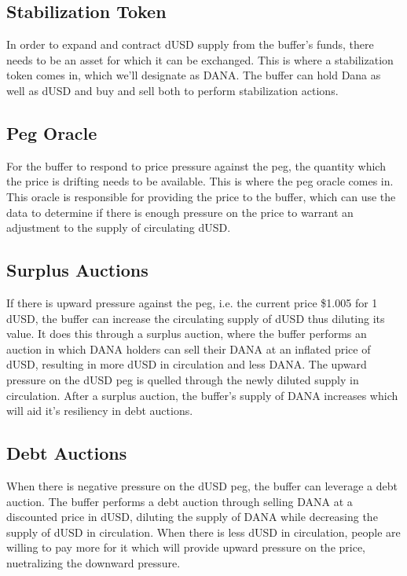 \documentclass[12pt]{article}
\begin{document}
\subsection{Stabilization Token}

In order to expand and contract dUSD supply from the buffer's funds, there needs to be an asset for which it can be exchanged. This is where a stabilization token comes in, which we'll designate as DANA. The buffer can hold Dana as well as dUSD and buy and sell both to perform stabilization actions.


\subsection{Peg Oracle}

For the buffer to respond to price pressure against the peg, the quantity which the price is drifting needs to be available. This is where the peg oracle comes in. This oracle is responsible for providing the price to the buffer, which can use the data to determine if there is enough pressure on the price to warrant an adjustment to the supply of circulating dUSD.


\subsection{Surplus Auctions}

If there is upward pressure against the peg, i.e. the current price \$1.005 for 1 dUSD, the buffer can increase the circulating supply of dUSD thus diluting its value. It does this through a surplus auction, where the buffer performs an auction in which DANA holders can sell their DANA at an inflated price of dUSD, resulting in more dUSD in circulation and less DANA. The upward pressure on the dUSD peg is quelled through the newly diluted supply in circulation. After a surplus auction, the buffer's supply of DANA increases which will aid it's resiliency in debt auctions.

\subsection{Debt Auctions}

When there is negative pressure on the dUSD peg, the buffer can leverage a debt auction. The buffer performs a debt auction through selling DANA at a discounted price in dUSD, diluting the supply of DANA while decreasing the supply of dUSD in circulation. When there is less dUSD in circulation, people are willing to pay more for it which will provide upward pressure on the price, nuetralizing the downward pressure.
\end{document}
